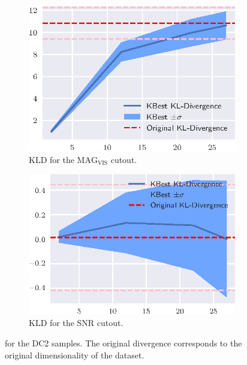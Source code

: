 \begin{figure}[htbp]
    \begin{subfigure}[]{0.5\textwidth}
    \includegraphics[width=\textwidth]{images/6_som/divergence/dc2_mag_divergence.eps}
    \caption{\gls{KLD} for the $\text{MAG}_\text{VIS}$ cutout.}
    \end{subfigure}
    \hfill
    \begin{subfigure}[]{0.5\textwidth}
    \includegraphics[width=\textwidth]{images/6_som/divergence/dc2_snr_divergence.eps}
    \caption{\gls{KLD} for the \gls{SNR} cutout.}
    \end{subfigure}
    \caption[ for the DC2 samples.]{ for the DC2 samples. The original divergence
    corresponds to the original dimensionality of the dataset.}
    \label{fig:divergence_dc2}
\end{figure}

